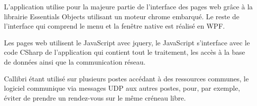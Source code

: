 L'application utilise pour la majeure partie de l'interface des pages web grâce 
à la librairie Essentials Objects utilisant un moteur chrome embarqué.
Le reste de l'interface qui comprend le menu et la fenêtre native est réalisé en WPF. \newline

Les pages web utilisent le JavaScript avec jquery, 
le JavaScript s'interface avec le code CSharp de l'application qui contient tout le traitement, 
les accès à la base de données ainsi que la communication réseau. \newline

\gls{Callibri} étant utilisé sur plusieurs postes accédant à des ressources communes, 
le logiciel communique via messages UDP aux autres postes, pour, par exemple, éviter de prendre 
un rendez-vous sur le même créneau libre. \newline

